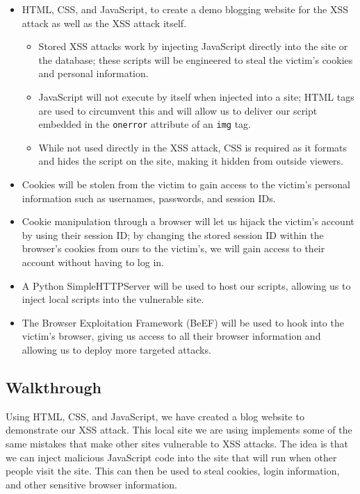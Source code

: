\documentclass{article}
\begin{document}
    \begin{itemize}[labelindent=\parindent, leftmargin=*]
        \item HTML, CSS, and JavaScript, to create a demo blogging website for the XSS attack as well as the XSS attack itself.
        \vspace{-6pt}
        \begin{itemize}[parsep=4pt]
            \item Stored XSS attacks work by injecting JavaScript directly into the site or the database; these scripts will be engineered to steal the victim's cookies and personal information.
            \item JavaScript will not execute by itself when injected into a site; HTML tags are used to circumvent this and will allow us to deliver our script embedded in the \texttt{onerror} attribute of an \texttt{img} tag.
            \item While not used directly in the XSS attack, CSS is required as it formats and hides the script on the site, making it hidden from outside viewers.
        \end{itemize}
        \vspace{-2pt}
        \item Cookies will be stolen from the victim to gain access to the victim's personal information such as usernames, passwords, and session IDs.
        \item Cookie manipulation through a browser will let us hijack the victim's account by using their session ID; by changing the stored session ID within the browser's cookies from ours to the victim's, we will gain access to their account without having to log in.
        \item A Python SimpleHTTPServer will be used to host our scripts, allowing us to inject local scripts into the vulnerable site.
        \item The Browser Exploitation Framework (BeEF) will be used to hook into the victim's browser, giving us access to all their browser information and allowing us to deploy more targeted attacks.
    \end{itemize} 

    \subsection*{Walkthrough}

    Using HTML, CSS, and JavaScript, we have created a blog website to demonstrate our XSS attack. This local site we are using implements some of the same mistakes that make other sites vulnerable to XSS attacks. The idea is that we can inject malicious JavaScript code into the site that will run when other people visit the site. This can then be used to steal cookies, login information, and other sensitive browser information.
\end{document}
